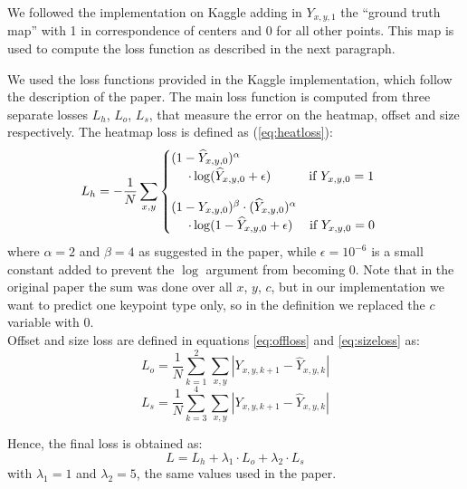 We followed the implementation on Kaggle adding in $Y_{x,y,1}$ the “ground truth map” with 1 in correspondence of centers and 0 for all other points. This map is used to compute the loss function as described in the next paragraph.

\label{ssssec:lossfunctiondet}

We used the loss functions provided in the Kaggle implementation, which follow the description of the paper. The main loss function is computed from three separate losses $L_h$, $L_o$, $L_s$, that measure the error on the heatmap, offset and size respectively. The heatmap loss is defined as (\ref{eq:heatloss}):
\begin{gather}
\begin{aligned}
L_h=-\dfrac{1}{N}\sum_{x,y}
\begin{cases}
(1-\widehat{Y}_{x,y,0})^{\alpha} \\~~~~\cdot \log(\widehat{Y}_{x,y,0} + \epsilon)~~~~~~~~~\text{if}~Y_{x,y,0} = 1 \vspace*{10pt} \\
(1-Y_{x,y,0})^{\beta} \cdot (\widehat{Y}_{x,y,0})^\alpha \\ ~~~~\cdot \log(1-\widehat{Y}_{x,y,0} + \epsilon) ~~~~\text{if}~Y_{x,y,0}=0
\end{cases}
\end{aligned}
\label{eq:heatloss}
\raisetag{37pt}
\end{gather}
where $\alpha=2$ and $\beta=4$ as suggested in the paper, while $\epsilon=10^{-6}$ is a small constant added to prevent the $\log$ argument from becoming $0$. Note that in the original paper the sum was done over all $x$, $y$, $c$, but in our implementation we want to predict one keypoint type only, so in the definition we replaced the $c$ variable with $0$.\\
Offset and size loss are defined in equations \ref{eq:offloss} and \ref{eq:sizeloss} as:
\begin{equation}\label{eq:offloss}
L_o = \dfrac{1}{N}\sum_{k=1}^{2}\sum_{x,y}\left|Y_{x,y,k+1} - \widehat{Y}_{x,y,k}\right|
\end{equation}
\begin{equation}\label{eq:sizeloss}
	L_s = \dfrac{1}{N}\sum_{k=3}^{4}\sum_{x,y}\left|Y_{x,y,k+1} - \widehat{Y}_{x,y,k}\right|
\end{equation}

\noindent Hence, the final loss is obtained as:
\begin{equation}
	L=L_h+ \lambda_1 \cdot L_o+ \lambda_2 \cdot L_s
\end{equation}
with $\lambda_1=1$ and $\lambda_2=5$, the same values used in the paper.

